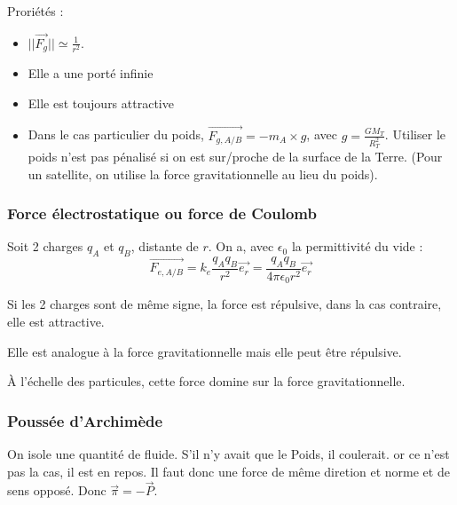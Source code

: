 \documentclass[french]{yLectureNote}
\renewcommand{\vec}{\overrightarrow}
\newcommand{\norm}[1]{||\vec{#1}||}
\begin{document}
Proriétés :
\begin{itemize}
 \item $\norm{F_g} \simeq \frac{1}{r^2}$.
 \item Elle a une porté infinie
 \item Elle est toujours attractive
 \item Dans le cas particulier du poids, $\vec{F_{g,A/B}} = -m_A \times g$, avec $g = \frac{GM_T}{R_T^2}$. Utiliser le poids n'est pas pénalisé si on est sur/proche de la surface de la Terre. (Pour un satellite, on utilise la force gravitationnelle au lieu du poids).
\end{itemize}
\subsubsection{Force électrostatique ou force de Coulomb}

Soit 2 charges $q_A$ et $q_B$, distante de $r$. On a, avec $\epsilon_0$ la permittivité du vide :
\[\vec{F_{e,A/B}} = k_e\frac{q_Aq_B}{r^2} \vec{e_r} = \frac{q_Aq_B}{4\pi \epsilon_0r^2} \vec{e_r}\]

Si les 2 charges sont de m\^eme signe, la force est répulsive, dans la cas contraire, elle est attractive.

Elle est analogue à la force gravitationnelle mais elle peut \^etre répulsive.

À l'échelle des particules, cette force domine sur la force gravitationnelle.

\subsubsection{Poussée d'Archimède}

On isole une quantité de fluide. S'il n'y avait que le Poids, il coulerait. or ce n'est pas la cas, il est en repos. Il faut donc une force de m\^eme diretion et norme et de sens opposé. Donc $\vec{\pi} = - \vec{P}$.
\end{document}
